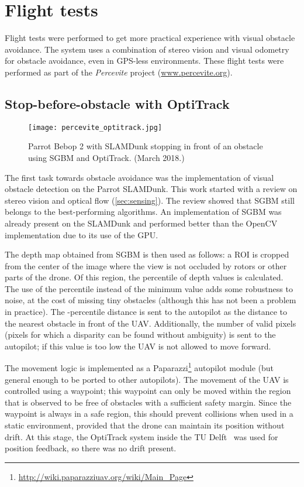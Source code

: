 \section{Flight tests}
Flight tests were performed to get more practical experience with visual obstacle avoidance.
The system uses a combination of stereo vision and visual odometry for obstacle avoidance, even in GPS-less environments.
These flight tests were performed as part of the \emph{Percevite} project (\url{www.percevite.org}).

\subsection{Stop-before-obstacle with OptiTrack}
\begin{figure}
\centering
\texttt{[image: percevite\_optitrack.jpg]}
\caption{Parrot Bebop 2 with SLAMDunk stopping in front of an obstacle using \acs{SGBM} and OptiTrack. (March 2018.)}
\label{fig:percevite_optitrack}
\end{figure}



The first task towards obstacle avoidance was the implementation of visual obstacle detection on the Parrot SLAMDunk.
This work started with a review on stereo vision and optical flow (\autoref{sec:sensing}).
The review showed that \acs{SGBM} \cite{Hirschmuller2008} still belongs to the best-performing algorithms.
An implementation of \acs{SGBM} was already present on the SLAMDunk and performed better than the OpenCV implementation due to its use of the GPU.

The depth map obtained from \acs{SGBM} is then used as follows: a \ac{ROI}  is cropped from the center of the image where the view is not occluded by rotors or other parts of the drone.
Of this region, the  percentile of depth values is calculated.
The use of the  percentile instead of the minimum value adds some robustness to noise, at the cost of missing tiny obstacles (although this has not been a problem in practice).
The -percentile distance is sent to the autopilot as the distance to the nearest obstacle in front of the \ac{UAV}.
Additionally, the number of valid pixels (pixels for which a disparity can be found without ambiguity) is sent to the autopilot; if this value is too low the \ac{UAV} is not allowed to move forward.

The movement logic is implemented as a Paparazzi\footnote{\url{http://wiki.paparazziuav.org/wiki/Main_Page}} autopilot module (but general enough to be ported to other autopilots).
The movement of the \ac{UAV} is controlled using a waypoint; this waypoint can only be moved within the region that is observed to be free of obstacles with a sufficient safety margin.
Since the waypoint is always in a safe region, this should prevent collisions when used in a static environment, provided that the drone can maintain its position without drift.
At this stage, the OptiTrack system inside the TU Delft \cyberzoo\ was used for position feedback, so there was no drift present.

